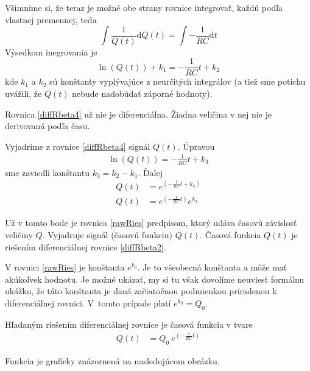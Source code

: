 \documentclass[a4paper, 10pt, ]{article}
\begin{document}
Všimnime si, že teraz je možné obe strany rovnice integrovať, každú podľa vlastnej premennej, teda
\begin{equation} \label{diffRbeta3}
    \int \frac{1}{Q(t)}\text{d}Q(t) =  \int - \frac{1}{RC} \text{d}t
\end{equation}
Výsedkom inegrovania je
\begin{equation} \label{diffRbeta4}
     \ln \left(  Q(t)  \right) + k_1 =   - \frac{1}{RC} t + k_2
\end{equation}
kde $k_1$ a $k_2$ sú konštanty vyplývajúce z neurčitých integrálov (a tiež sme potichu uvážili, že $Q(t)$ nebude nadobúdať záporné hodnoty).





\bigskip

Rovnica \eqref{diffRbeta4} už nie je diferenciálna. Žiadna veličina v nej nie je derivovaná podľa času.

Vyjadrime z rovnice \eqref{diffRbeta4} signál $Q(t)$. Úpravou
\begin{align}
    \ln \left(  Q(t)  \right)  =   - \frac{1}{RC} t + k_3
\end{align}
sme zaviedli konštantu $k_3 = k_2 - k_1$. Ďalej
\begin{subequations}
    \begin{align}
        Q(t)   &=  e^{\left( - \frac{1}{RC} t + k_3 \right)} \\
        Q(t)   &=  e^{\left( - \frac{1}{RC} t \right)}  e^{k_3} \label{rawRies}
    \end{align}
\end{subequations}

Už v tomto bode je rovnica \eqref{rawRies} predpisom, ktorý udáva časovú závislosť veličiny $Q$. Vyjadruje signál (časovú funkciu) $Q(t)$. Časová funkcia $Q(t)$ je riešením diferenciálnej rovnice \eqref{diffRbeta2}.

V rovnici \eqref{rawRies} je konštanta $e^{k_3}$. Je to všeobecná konštanta a môže mať akúkoľvek hodnotu. Je možné ukázať, my si tu však dovolíme neuviesť formálnu ukážku, že táto konštanta je daná začiatočnou podmienkou priradenou k diferenciálnej rovnici. V~tomto prípade platí $e^{k_3} = Q_0$.

Hľadaným riešením diferenciálnej rovnice je časová funkcia v tvare
\begin{align}
    Q(t)   &=  Q_0 \ e^{\left( - \frac{1}{RC} t \right)}   \label{rawRies2}
\end{align}


\noindent
Funkcia je graficky znázornená na nasledujúcom obrázku.
\end{document}
